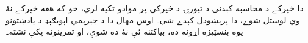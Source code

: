\documentclass[../../../include/open-logic-chapter]{subfiles}
\begin{document}
\begin{editorial}
  دا څپرکے د محاسبه کېدنې د تيورۍ د څپرکي پر موادو تکيه لري، خو که
  هغه څپرکے نۀ وي لوستل شوے، دا پرېښودل کېدے شي۔ اوس مهال دا د
  جېرېمي اېويګېډ د يادښتونو يوه بنسټيزه اړونه ده، بياکتنه ئې نۀ ده
  شوې، او تمرينونه پکې نشته۔
\end{editorial}












\OLEndChapterHook
\end{document}
